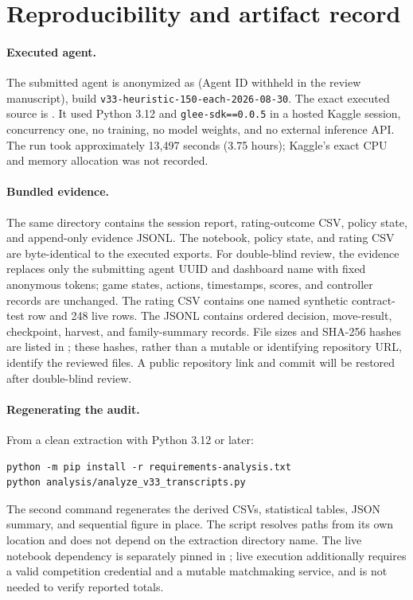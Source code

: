 \section{Reproducibility and artifact record}
\label{app:reproducibility}

\paragraph{Executed agent.}
The submitted agent is anonymized as \AgentName{} (Agent ID withheld in the
review manuscript), build
\texttt{v33-heuristic-150-each-2026-08-30}. The exact executed source is
.
It used Python 3.12 and \texttt{glee-sdk==0.0.5} in a hosted Kaggle session,
concurrency one, no training, no model weights, and no external inference API.
The run took approximately 13,497 seconds (3.75 hours); Kaggle's exact CPU and
memory allocation was not recorded.

\paragraph{Bundled evidence.}
The same directory contains the session report, rating-outcome CSV,
policy state, and append-only evidence JSONL. The notebook, policy state, and
rating CSV are byte-identical to the executed exports. For double-blind review,
the evidence replaces only the submitting agent UUID and dashboard name with
fixed anonymous tokens; game states, actions, timestamps, scores, and controller
records are unchanged. The rating CSV contains one named
synthetic contract-test row and 248 live rows. The JSONL contains ordered
decision, move-result, checkpoint, harvest, and family-summary records. File
sizes and SHA-256 hashes are listed in
; these hashes, rather than a
mutable or identifying repository URL, identify the reviewed files. A public
repository link and commit will be restored after double-blind review.

\paragraph{Regenerating the audit.}
From a clean extraction with Python 3.12 or later:
\begin{verbatim}
python -m pip install -r requirements-analysis.txt
python analysis/analyze_v33_transcripts.py
\end{verbatim}
The second command regenerates the derived CSVs, statistical tables, JSON
summary, and sequential figure in place. The script resolves paths from its own
location and does not depend on the extraction directory name. The live
notebook dependency is separately pinned in ; live
execution additionally requires a valid competition credential and a mutable
matchmaking service, and is not needed to verify reported totals.

